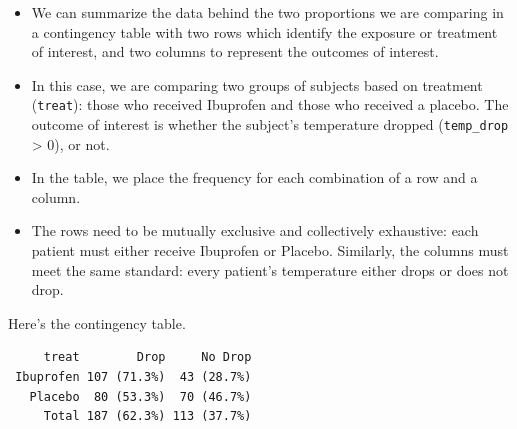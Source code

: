 \documentclass[
]{book}
\newenvironment{Shaded}{\begin{snugshade}}{\end{snugshade}}
\newcommand{\DataTypeTok}[1]{\textcolor[rgb]{0.13,0.29,0.53}{#1}}
\newcommand{\DecValTok}[1]{\textcolor[rgb]{0.00,0.00,0.81}{#1}}
\newcommand{\KeywordTok}[1]{\textcolor[rgb]{0.13,0.29,0.53}{\textbf{#1}}}
\newcommand{\NormalTok}[1]{#1}
\newcommand{\OperatorTok}[1]{\textcolor[rgb]{0.81,0.36,0.00}{\textbf{#1}}}
\newcommand{\StringTok}[1]{\textcolor[rgb]{0.31,0.60,0.02}{#1}}
\providecommand{\tightlist}{%
  \setlength{\itemsep}{0pt}\setlength{\parskip}{0pt}}
\begin{document}
\begin{itemize}
\tightlist
\item
  We can summarize the data behind the two proportions we are comparing in a contingency table with two rows which identify the exposure or treatment of interest, and two columns to represent the outcomes of interest.
\item
  In this case, we are comparing two groups of subjects based on treatment (\texttt{treat}): those who received Ibuprofen and those who received a placebo. The outcome of interest is whether the subject's temperature dropped (\texttt{temp\_drop} \textgreater{} 0), or not.
\item
  In the table, we place the frequency for each combination of a row and a column.
\item
  The rows need to be mutually exclusive and collectively exhaustive: each patient must either receive Ibuprofen or Placebo. Similarly, the columns must meet the same standard: every patient's temperature either drops or does not drop.
\end{itemize}

Here's the contingency table.

\begin{Shaded}
\end{Shaded}

\begin{verbatim}
     treat        Drop     No Drop
 Ibuprofen 107 (71.3%)  43 (28.7%)
   Placebo  80 (53.3%)  70 (46.7%)
     Total 187 (62.3%) 113 (37.7%)
\end{verbatim}
\end{document}
